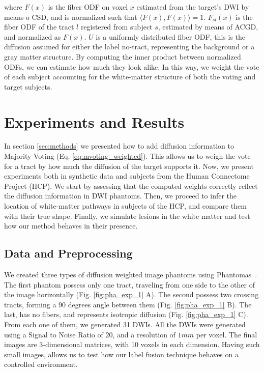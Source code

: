 where $F(x)$ is the fiber ODF on voxel $x$ estimated from the target's DWI by
means o CSD, and is normalized such that $\langle F(x),F(x) \rangle = 1$.
$F_{sl}(x)$ is the fiber ODF of the tract $l$ registered from subject $s$,
estimated by means of ACGD, and normalized as $F(x)$. $U$ is a uniformly
distributed fiber ODF, this is the diffusion assumed for either the label 
no-tract, representing the background or a gray matter structure.
By computing the inner product between normalized ODFs, we can estimate how much
they look alike. In this way, we weight the vote of each subject accounting for
the white-matter structure of both the voting and target subjects.

\section{Experiments and Results}
In section \ref{sec:methods} we presented how to add diffusion information to
Majority Voting (Eq. \ref{eq:mvoting_weighted}). This allows us to weigh the
vote for a tract by how much the diffusion of the target supports it. Now, we present
experiments both in synthetic data and subjects from the Human Connectome 
Project (HCP). We start by assessing that the computed weights correctly reflect
the diffusion information in DWI phantoms. Then, we proceed to infer the location
of white-matter pathways in subjects of the HCP, and compare them with their
true shape. Finally, we simulate lesions in the white matter and test how our
method behaves in their presence.

\subsection{Data and Preprocessing}
We created three types of diffusion weighted image phantoms using Phantomas~\cite{Caruyer2014}.
The first phantom possess only one tract, traveling from one side to the other of the
image horizontally (Fig. \ref{fig:pha_exp_1} A). The second possess two crossing tracts,
forming a 90 degrees angle between them (Fig. \ref{fig:pha_exp_1} B). The last, has no
fibers, and represents isotropic diffusion (Fig. \ref{fig:pha_exp_1} C). From
each one of them, we generated 31 DWIs. All the DWIs were generated using a
Signal to Noise Ratio of 20, and a resolution of $1mm$ per voxel. The final
images are 3-dimensional matrices, with 10 voxels in each dimension. Having
such small images, allows us to test how our label fusion technique behaves
on a controlled environment.


